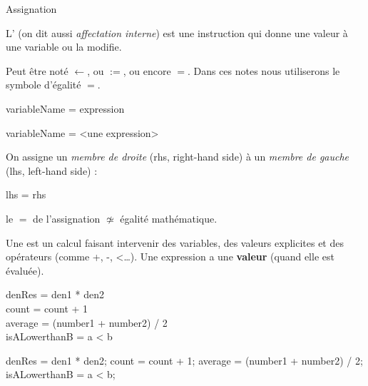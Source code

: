 \begin{frame}[fragile]{Assignation}
  \begin{definition}[Assignation]
    L’
    (on dit aussi \emph{affectation interne})
    est une instruction qui donne une valeur 
    à une variable ou la modifie.
  \end{definition}


  Peut être noté
  $\leftarrow$, ou $:=$, ou encore $=$.
  Dans ces notes nous utiliserons le symbole d'égalité $=$.

  \begin{langagenaturel}
variableName = expression
  \end{langagenaturel}

  \begin{java}
variableName = <une expression>
  \end{java}
\end{frame}

\begin{frame}[fragile]
  On assigne un \emph{membre de droite} (rhs, right-hand side) à un
  \emph{membre de gauche} (lhs, left-hand side) :
  \begin{java}
lhs = rhs
  \end{java}

  \pause
  \bcattention le \(=\) de l'assignation \(\not\simeq\) égalité mathématique.
\end{frame}

\begin{frame}[fragile]
  \begin{definition}[Expression]
    Une  est un calcul faisant
    intervenir des variables, des valeurs explicites et des opérateurs
    (comme +, -, <\dots).  Une expression a une \textbf{valeur} (quand elle est
    évaluée).
  \end{definition}

  \pause
  \begin{langagenaturel}
     denRes = den1 * den2\\
     count = count + 1\\
     average = (number1 + number2) / 2\\
     isALowerthanB = a < b 
  \end{langagenaturel}

  \begin{java}
denRes = den1 * den2;
count = count + 1;
average = (number1 + number2) / 2;
isALowerthanB = a < b;
  \end{java}
\end{frame}

